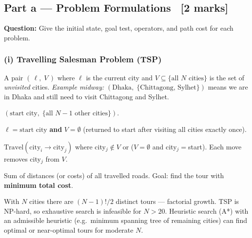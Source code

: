 \documentclass[12pt, a4paper]{article}
\newenvironment{solutionbox}{\begin{mdframed}[style=solutionframe]}{\end{mdframed}}
\begin{document}
\subsection{Part a — Problem Formulations \ [2 marks]}

\begin{solutionbox}
\textbf{Question:} Give the initial state, goal test, operators, and path cost for each problem.
\end{solutionbox}

\subsubsection*{(i) Travelling Salesman Problem (TSP)}

\begin{description}[leftmargin=3.6cm, labelwidth=3.4cm, labelsep=0.2cm]
  \item[\textbf{State:}]
    A pair $(\,\ell,\; V\,)$ where $\ell$ is the current city and $V \subseteq \{\text{all } N \text{ cities}\}$ is the set of \emph{unvisited} cities.
    \emph{Example midway:} $(\text{Dhaka},\; \{\text{Chittagong, Sylhet}\})$ means we are in Dhaka and still need to visit Chittagong and Sylhet.

  \item[\textbf{Initial state:}]
    $(\text{start city},\; \{\text{all } N{-}1 \text{ other cities}\})$.

  \item[\textbf{Goal test:}]
    $\ell = \text{start city}$ \textbf{and} $V = \emptyset$ \quad (returned to start after visiting all cities exactly once).

  \item[\textbf{Operators:}]
    $\text{Travel}(\text{city}_i \to \text{city}_j)$ where city$_j \notin V$ or ($V{=}\emptyset$ and city$_j{=}$start). Each move removes city$_j$ from $V$.

  \item[\textbf{Path cost:}]
    Sum of distances (or costs) of all travelled roads. Goal: find the tour with \textbf{minimum total cost}.

  \item[\textbf{Complexity note:}]
    With $N$ cities there are $(N{-}1)!/2$ distinct tours — factorial growth. TSP is NP-hard, so exhaustive search is infeasible for $N>20$. Heuristic search (A*) with an admissible heuristic (e.g.\ minimum spanning tree of remaining cities) can find optimal or near-optimal tours for moderate $N$.
\end{description}
\end{document}
